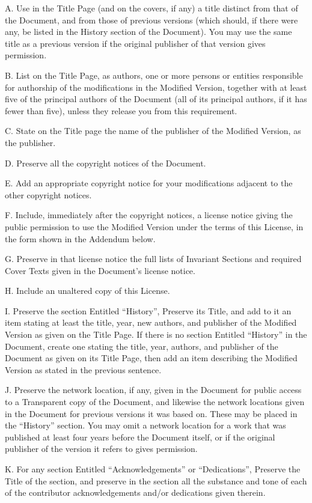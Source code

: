 A. Use in the Title Page (and on the covers, if any) a title distinct
from that of the Document, and from those of previous versions (which
should, if there were any, be listed in the History section of the
Document). You may use the same title as a previous version if the
original publisher of that version gives permission.

B. List on the Title Page, as authors, one or more persons or entities
responsible for authorship of the modifications in the Modified Version,
together with at least five of the principal authors of the Document
(all of its principal authors, if it has fewer than five), unless they
release you from this requirement.

C. State on the Title page the name of the publisher of the Modified
Version, as the publisher.

D. Preserve all the copyright notices of the Document.

E. Add an appropriate copyright notice for your modifications adjacent
to the other copyright notices.

F. Include, immediately after the copyright notices, a license notice
giving the public permission to use the Modified Version under the terms
of this License, in the form shown in the Addendum below.

G. Preserve in that license notice the full lists of Invariant Sections
and required Cover Texts given in the Document's license notice.

H. Include an unaltered copy of this License.

I. Preserve the section Entitled ``History'', Preserve its Title, and
add to it an item stating at least the title, year, new authors, and
publisher of the Modified Version as given on the Title Page. If there
is no section Entitled ``History'' in the Document, create one stating
the title, year, authors, and publisher of the Document as given on its
Title Page, then add an item describing the Modified Version as stated
in the previous sentence.

J. Preserve the network location, if any, given in the Document for
public access to a Transparent copy of the Document, and likewise the
network locations given in the Document for previous versions it was
based on. These may be placed in the ``History'' section. You may omit a
network location for a work that was published at least four years
before the Document itself, or if the original publisher of the version
it refers to gives permission.

K. For any section Entitled ``Acknowledgements'' or ``Dedications'',
Preserve the Title of the section, and preserve in the section all the
substance and tone of each of the contributor acknowledgements and/or
dedications given therein.

